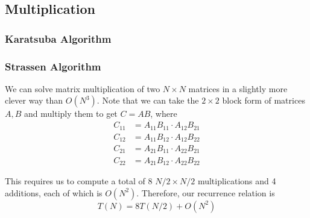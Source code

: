 \documentclass{article}
\begin{document}
  \subsection{Multiplication}

    \subsubsection{Karatsuba Algorithm}


    \subsubsection{Strassen Algorithm}

      We can solve matrix multiplication of two $N \times N$ matrices in a slightly more clever way than $O(N^3)$. Note that we can take the $2 \times 2$ block form of matrices $A, B$ and multiply them to get $C = AB$, where 
      \begin{align}
        C_{11} & = A_{11} B_{11} \cdot A_{12} B_{21} \\ 
        C_{12} & = A_{11} B_{12} \cdot A_{12} B_{22} \\ 
        C_{21} & = A_{21} B_{11} \cdot A_{22} B_{21} \\ 
        C_{22} & = A_{21} B_{12} \cdot A_{22} B_{22} 
      \end{align}

      This requires us to compute a total of $8$ $N/2 \times N/2$ multiplications and 4 additions, each of which is $O(N^2)$. Therefore, our recurrence relation is 
      \begin{equation}
        T(N) = 8 T(N/2) + O(N^2)
      \end{equation}
\end{document}
